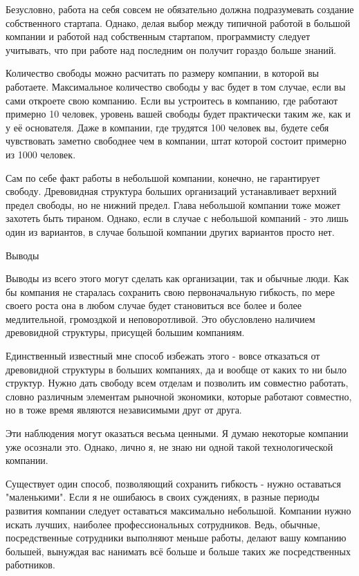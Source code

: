 \documentclass[ebook,12pt,oneside,openany]{memoir}
\begin{document}
Безусловно, работа на себя совсем не обязательно должна подразумевать
создание собственного стартапа. Однако, делая выбор между типичной
работой в большой компании и работой над собственным стартапом,
программисту следует учитывать, что при работе над последним он
получит гораздо больше знаний.

Количество свободы можно расчитать по размеру компании, в которой вы
работаете. Максимальное количество свободы у вас будет в том случае,
если вы сами откроете свою компанию. Если вы устроитесь в компанию,
где работают примерно 10 человек, уровень вашей свободы будет
практически таким же, как и у её основателя. Даже в компании, где
трудятся 100 человек вы, будете себя чувствовать заметно свободнее чем
в компании, штат которой состоит примерно из 1000 человек.

Сам по себе факт работы в небольшой компании, конечно, не гарантирует
свободу. Древовидная структура больших организаций устанавливает
верхний предел свободы, но не нижний предел. Глава небольшой компании
тоже может захотеть быть тираном. Однако, если в случае с небольшой
компаний - это лишь один из вариантов, в случае большой компании
других вариантов просто нет.

Выводы

Выводы из всего этого могут сделать как организации, так и обычные
люди. Как бы компания не старалась сохранить свою первоначальную
гибкость, по мере своего роста она в любом случае будет становиться
все более и более медлительной, громоздкой и неповоротливой. Это
обусловлено наличием древовидной структуры, присущей большим
компаниям.

Единственный известный мне способ избежать этого - вовсе отказаться от
древовидной структуры в больших компаниях, да и вообще от каких то ни
было структур. Нужно дать свободу всем отделам и позволить им
совместно работать, словно различным элементам рыночной экономики,
которые работают совместно, но в тоже время являются независимыми друг
от друга.

Эти наблюдения могут оказаться весьма ценными. Я думаю некоторые
компании уже осознали это. Однако, лично я, не знаю ни одной такой
технологической компании.

Существует один способ, позволяющий сохранить гибкость - нужно
оставаться "маленькими". Если я не ошибаюсь в своих суждениях, в
разные периоды развития компании следует оставаться максимально
небольшой. Компании нужно искать лучших, наиболее профессиональных
сотрудников. Ведь, обычные, посредственные сотрудники выполняют меньше
работы, делают вашу компанию большей, вынуждая вас нанимать всё больше
и больше таких же посредственных работников.
\end{document}
